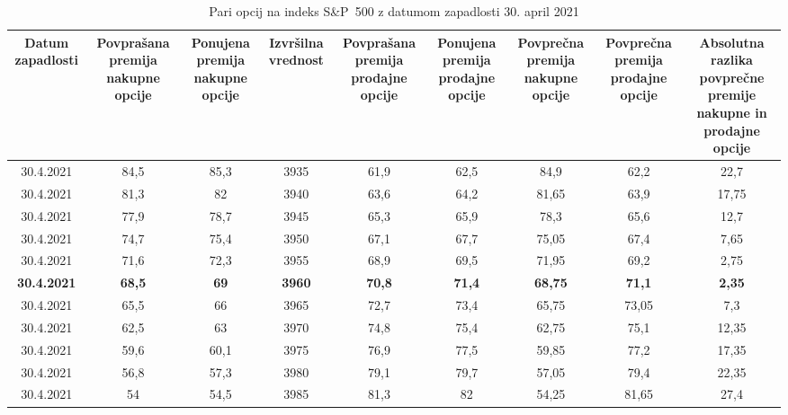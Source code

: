 \documentclass[12pt,a4paper, reqno]{amsart}
\theoremstyle{definition} %
\theoremstyle{plain} %
\begin{document}
\begin{table}[h!]
 \tiny
  \caption{Pari opcij na indeks S\&P~500 z datumom zapadlosti 30. april 2021}
  \label{table:Tabela 2}
  \begin{adjustbox}{center}
    \begin{tabular}{|c|c|c|c|c|c|c|c|c|}
    \hline
    \multicolumn{1}{|p{5.1em}|}{\textbf{Datum zapadlosti}} & \multicolumn{1}{p{5.7em}|}{\textbf{Povprašana premija nakupne opcije}} & \multicolumn{1}{p{5em}|}{\textbf{Ponujena premija nakupne opcije}} & \multicolumn{1}{p{4.4em}|}{\textbf{Izvršilna vrednost}} & \multicolumn{1}{p{5.8em}|}{\textbf{Povprašana premija prodajne opcije}} & \multicolumn{1}{p{4.7em}|}{\textbf{Ponujena premija prodajne opcije}} & \multicolumn{1}{p{5.2em}|}{\textbf{Povprečna premija nakupne opcije}} & \multicolumn{1}{p{5.2em}|}{\textbf{Povprečna premija prodajne opcije}} & \multicolumn{1}{p{11em}|}{\textbf{Absolutna razlika povprečne premije nakupne in prodajne opcije}} \\
    \hline
    30.4.2021 & 84,5 & 85,3 & 3935 & 61,9 & 62,5 & 84,9 & 62,2 & 22,7 \\
    \hline
    30.4.2021 & 81,3 & 82 & 3940 & 63,6 & 64,2 & 81,65 & 63,9 & 17,75 \\
    \hline
    30.4.2021 & 77,9 & 78,7 & 3945 & 65,3 & 65,9 & 78,3 & 65,6 & 12,7 \\
    \hline
    30.4.2021 & 74,7 & 75,4 & 3950 & 67,1 & 67,7 & 75,05 & 67,4 & 7,65 \\
    \hline
    30.4.2021 & 71,6 & 72,3 & 3955 & 68,9 & 69,5 & 71,95 & 69,2 & 2,75 \\
    \hline
    \textbf{30.4.2021} & \textbf{68,5} & \textbf{69} & \textbf{3960} & \textbf{70,8} & \textbf{71,4} & \textbf{68,75} & \textbf{71,1} & \textbf{2,35}\\
    \hline
    30.4.2021 & 65,5 & 66 & 3965 & 72,7 & 73,4 & 65,75 & 73,05 & 7,3 \\
    \hline
    30.4.2021 & 62,5 & 63 & 3970 & 74,8 & 75,4 & 62,75 & 75,1 & 12,35 \\
    \hline
    30.4.2021 & 59,6 & 60,1 & 3975 & 76,9 & 77,5 & 59,85 & 77,2 & 17,35 \\
    \hline
    30.4.2021 & 56,8 & 57,3 & 3980 & 79,1 & 79,7 & 57,05 & 79,4 & 22,35 \\
    \hline
    30.4.2021 & 54 & 54,5 & 3985 & 81,3 & 82 & 54,25 & 81,65 & 27,4 \\
    \hline
    \end{tabular}
   \end{adjustbox}{}
\end{table}
\end{document}
